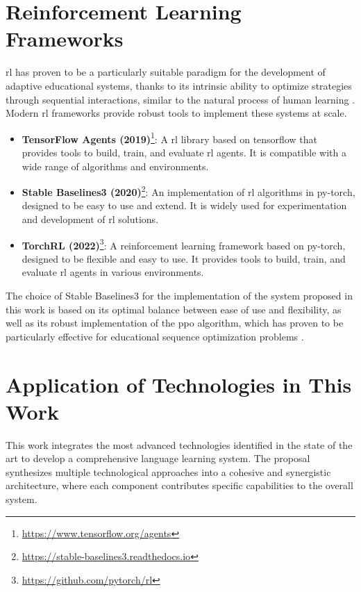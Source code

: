 \section{Reinforcement Learning Frameworks}
\label{sec:rl-frameworks}

\gls{rl} has proven to be a particularly suitable paradigm for the development of adaptive educational systems, thanks to its intrinsic ability to optimize strategies through sequential interactions, similar to the natural process of human learning \cite{williams2017educational}. Modern \gls{rl} frameworks provide robust tools to implement these systems at scale.


\begin{itemize}
  \item \textbf{TensorFlow Agents (2019)}\footnote{\url{https://www.tensorflow.org/agents}}: A \gls{rl} library based on \gls{tensorflow} that provides tools to build, train, and evaluate \gls{rl} agents. It is compatible with a wide range of algorithms and environments.
  \item \textbf{Stable Baselines3 (2020)}\footnote{\url{https://stable-baselines3.readthedocs.io}}: An implementation of \gls{rl} algorithms in \gls{py-torch}, designed to be easy to use and extend. It is widely used for experimentation and development of \gls{rl} solutions.
  \item \textbf{TorchRL (2022)}\footnote{\url{https://github.com/pytorch/rl}}: A reinforcement learning framework based on \gls{py-torch}, designed to be flexible and easy to use. It provides tools to build, train, and evaluate \gls{rl} agents in various environments.
\end{itemize}

The choice of Stable Baselines3 for the implementation of the system proposed in this work is based on its optimal balance between ease of use and flexibility, as well as its robust implementation of the \gls{ppo} algorithm, which has proven to be particularly effective for educational sequence optimization problems \citep{schulman2017proximal}.


\section{Application of Technologies in This Work}
\label{sec:technology-application}

This work integrates the most advanced technologies identified in the state of the art to develop a comprehensive language learning system. The proposal synthesizes multiple technological approaches into a cohesive and synergistic architecture, where each component contributes specific capabilities to the overall system.

